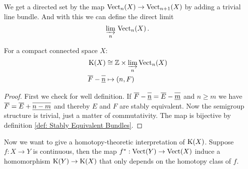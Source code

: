 \begin{definition}
	We get a directed set by the map $\operatorname{\mathrm{Vect}}_n(X)\to \operatorname{\mathrm{Vect}}_{n+1}(X)$ by adding a trivial line bundle. And with this we can define the direct limit
	\begin{equation*}
		\varinjlim_{n} \, \operatorname{\mathrm{Vect}}_n(X) \,. 
	\end{equation*}
\end{definition}
\begin{lemma}\label{lem: K-group is direkt limit of Vectn}
	For a compact connected space $X$:
	\begin{align*}
		\operatorname{\mathrm{K}}(X)&\cong \mathbb{Z} \times \varinjlim_{n} \operatorname{\mathrm{Vect}}_n(X)\\
		\overline{F}-\overline{\underline{n}\vphantom{E}} &\mapsto (n,F)
	\end{align*}
\end{lemma}
\begin{proof}
	First we check for well definition. If $\overline{F}-\overline{\underline{n}\vphantom{E}}=\overline{E}-\overline{\underline{m}\vphantom{E}}$ and $n\geq m$ we have $\overline{F}=\overline{E}+\overline{\underline{n-m}\vphantom{E}}$ and thereby $E$ and $F$ are stably equivalent. Now the semigroup structure is trivial, just a matter of commutativity. The map is bijective by definition \ref{def: Stably Equivalent Bundles}.
\end{proof}
Now we want to give a homotopy-theoretic interpretation of $\operatorname{\mathrm{K}}(X)$. Suppose $f:X\to Y$ is continuous, then the map $f^*:\operatorname{\mathrm{Vect}}(Y)\to \operatorname{\mathrm{Vect}}(X)$ induce a homomorphism $\operatorname{\mathrm{K}}(Y)\to \operatorname{\mathrm{K}}(X)$ that only depends on the homotopy class of $f$.
